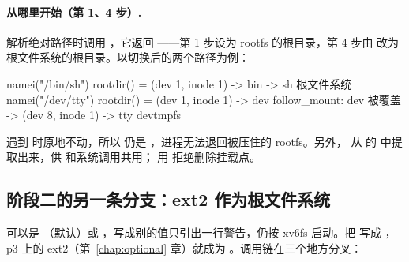 \paragraph{\code{/} 从哪里开始（第 1、4 步）.}  解析绝对路径时调用 ，它返回 ——第 1 步设为 rootfs 的根目录，第 4 步由  改为根文件系统的根目录。以切换后的两个路径为例：

\begin{txtcode}
namei("/bin/sh")    rootdir() = (dev 1, inode 1)  -> bin -> sh        根文件系统
namei("/dev/tty")   rootdir() = (dev 1, inode 1)  -> dev
                    follow_mount: dev 被覆盖 -> (dev 8, inode 1) -> tty  devtmpfs
\end{txtcode}

 遇到  时原地不动，所以  仍是 \code{/}，进程无法退回被压住的 rootfs。另外， 从  的  中提取出来，供  和系统调用共用； 用  拒绝删除挂载点。

\subsection{阶段二的另一条分支：ext2 作为根文件系统}
\label{sec:ext2-root}

 可以是 （默认）或 ，写成别的值只引出一行警告，仍按 xv6fs 启动。把  写成 ，p3 上的 ext2（第~\ref{chap:optional} 章）就成为 \code{/}。调用链在三个地方分叉：

